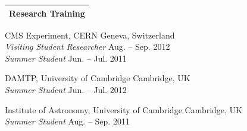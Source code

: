 \documentclass[letterpaper,11pt]{article}
\newenvironment{packed_itemize}{
\begin{itemize}[label=\raisebox{0.25ex}{\tiny$\bullet$}]
  \setlength{\itemsep}{4.2pt}
  \setlength{\parskip}{0pt}
  \setlength{\parsep}{0pt}}{\end{itemize}
}
\begin{document}
%
%
%


\noindent
\begin{tabular*}{\textwidth}{l@{\extracolsep{\fill}}}
\large {\sc \Large{Research Training}}\\
\hline
\end{tabular*}\vspace{1.mm}

\begin{packed_itemize}
  \item CMS Experiment, CERN \hfill Geneva, Switzerland \\ \emph{Visiting Student Researcher} \hfill Aug. -- Sep. 2012 \\ \emph{Summer Student} \hfill Jun. -- Jul. 2011
  \item DAMTP, University of Cambridge \hfill Cambridge, UK \\ \emph{Summer Student} \hfill Jun. -- Jul. 2012
  \item Institute of Astronomy, University of Cambridge \hfill Cambridge, UK \\ \emph{Summer Student} \hfill Aug. -- Sep. 2011
\end{packed_itemize}
\vspace{2.0mm}
\end{document}
